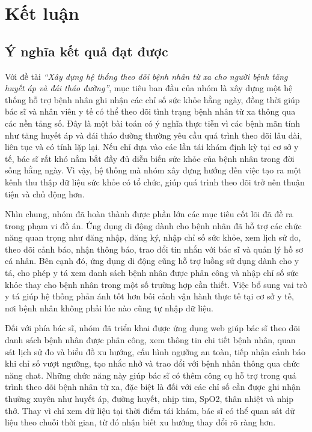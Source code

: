 \chapter{Kết luận}
\label{Chapter6}

\section{Ý nghĩa kết quả đạt được}
\par Với đề tài \textit{``Xây dựng hệ thống theo dõi bệnh nhân từ xa cho người bệnh tăng huyết áp và đái tháo đường''}, mục tiêu ban đầu của nhóm là xây dựng một hệ thống hỗ trợ bệnh nhân ghi nhận các chỉ số sức khỏe hằng ngày, đồng thời giúp bác sĩ và nhân viên y tế có thể theo dõi tình trạng bệnh nhân từ xa thông qua các nền tảng số. Đây là một bài toán có ý nghĩa thực tiễn vì các bệnh mãn tính như tăng huyết áp và đái tháo đường thường yêu cầu quá trình theo dõi lâu dài, liên tục và có tính lặp lại. Nếu chỉ dựa vào các lần tái khám định kỳ tại cơ sở y tế, bác sĩ rất khó nắm bắt đầy đủ diễn biến sức khỏe của bệnh nhân trong đời sống hằng ngày. Vì vậy, hệ thống mà nhóm xây dựng hướng đến việc tạo ra một kênh thu thập dữ liệu sức khỏe có tổ chức, giúp quá trình theo dõi trở nên thuận tiện và chủ động hơn.

\par Nhìn chung, nhóm đã hoàn thành được phần lớn các mục tiêu cốt lõi đã đề ra trong phạm vi đồ án. Ứng dụng di động dành cho bệnh nhân đã hỗ trợ các chức năng quan trọng như đăng nhập, đăng ký, nhập chỉ số sức khỏe, xem lịch sử đo, theo dõi cảnh báo, nhận thông báo, trao đổi tin nhắn với bác sĩ và quản lý hồ sơ cá nhân. Bên cạnh đó, ứng dụng di động cũng hỗ trợ luồng sử dụng dành cho y tá, cho phép y tá xem danh sách bệnh nhân được phân công và nhập chỉ số sức khỏe thay cho bệnh nhân trong một số trường hợp cần thiết. Việc bổ sung vai trò y tá giúp hệ thống phản ánh tốt hơn bối cảnh vận hành thực tế tại cơ sở y tế, nơi bệnh nhân không phải lúc nào cũng tự nhập dữ liệu.

\par Đối với phía bác sĩ, nhóm đã triển khai được ứng dụng web giúp bác sĩ theo dõi danh sách bệnh nhân được phân công, xem thông tin chi tiết bệnh nhân, quan sát lịch sử đo và biểu đồ xu hướng, cấu hình ngưỡng an toàn, tiếp nhận cảnh báo khi chỉ số vượt ngưỡng, tạo nhắc nhở và trao đổi với bệnh nhân thông qua chức năng chat. Những chức năng này giúp bác sĩ có thêm công cụ hỗ trợ trong quá trình theo dõi bệnh nhân từ xa, đặc biệt là đối với các chỉ số cần được ghi nhận thường xuyên như huyết áp, đường huyết, nhịp tim, SpO2, thân nhiệt và nhịp thở. Thay vì chỉ xem dữ liệu tại thời điểm tái khám, bác sĩ có thể quan sát dữ liệu theo chuỗi thời gian, từ đó nhận biết xu hướng thay đổi rõ ràng hơn.

